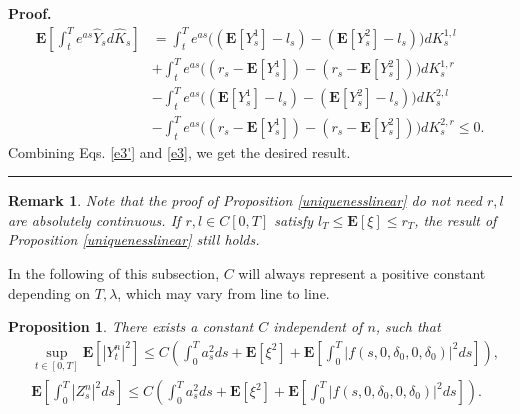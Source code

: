 \documentclass[10pt]{article}%
\numberwithin{equation}{section}
\newtheorem{proposition}[theorem]{Proposition}
\newtheorem{remark}[theorem]{Remark}
\newenvironment{proof}[1][Proof]{\noindent \textbf{#1.} }{\  \rule{0.5em}{0.5em}}
\def \E{\mathbf{E}}
\begin{document}
\begin{proof}
\begin{equation}
\begin{split}
\E\left[\int_t^T e^{as}\hat{Y}_s d\hat{K}_s\right]&=\int_t^T e^{as}\big((\E[Y_s^1]-l_s)-(\E[Y_s^2]-l_s)\big)dK^{1,l}_s\\
&+\int_t^T e^{as}\big((r_s-\E[Y_s^1])-(r_s-\E[Y_s^2])\big)dK^{1,r}_s\\
&-\int_t^T e^{as}\big((\E[Y_s^1]-l_s)-(\E[Y_s^2]-l_s)\big)dK^{2,l}_s\\
&-\int_t^T e^{as}\big((r_s-\E[Y_s^1])-(r_s-\E[Y_s^2])\big)dK^{2,r}_s\leq 0.
\end{split}
\end{equation}
Combining Eqs. \eqref{e3'} and \eqref{e3}, we get the desired result.
\end{proof}

\begin{remark}
Note that the proof of Proposition \ref{uniquenesslinear} do not need $r,l$ are absolutely continuous. If $r,l\in C[0,T]$ satisfy $l_T\leq \E[\xi]\leq r_T$, the result of Proposition \ref{uniquenesslinear} still holds.
\end{remark}


In the following of this subsection, $C$ will always represent a positive constant  depending on $T,\lambda$, which may vary from line to line. %

\begin{proposition}\label{estimateYnZn}
There exists a constant $C$ independent of $n$, such that
\begin{align*}
&\sup_{t\in[0,T]}\E[\left|Y_t^n\right|^2]\leq C\left(\int_0^T a_s^2ds+\E\left[\xi^2\right]+\E\left[\int_0^T |f(s,0,\delta_0,0,\delta_0)|^2 ds\right]\right),\\
&\E\left[\int_0^T \left|Z_s^n\right|^2 ds\right]\leq C\left(\int_0^T a_s^2ds+\E\left[\xi^2\right]+\E\left[\int_0^T \left|f(s,0,\delta_0,0,\delta_0)\right|^2 ds\right]\right).
\end{align*}
\end{proposition}
\end{document}
